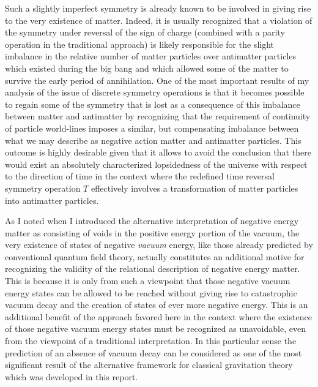 \documentclass[notitlepage,12pt]{report}
\begin{document}
Such a slightly imperfect symmetry is already known to be involved in giving rise to the very existence of matter. Indeed, it is usually recognized that a violation of the symmetry under reversal of the sign of charge (combined with a parity operation in the traditional approach) is likely responsible for the slight imbalance in the relative number of matter particles over antimatter particles which existed during the big bang and which allowed some of the matter to survive the early period of annihilation. One of the most important results of my analysis of the issue of discrete symmetry operations is that it becomes possible to regain some of the symmetry that is lost as a consequence of this imbalance between matter and antimatter by recognizing that the requirement of continuity of particle world-lines imposes a similar, but compensating imbalance between what we may describe as negative action matter and antimatter particles. This outcome is highly desirable given that it allows to avoid the conclusion that there would exist an absolutely characterized lopsidedness of the universe with respect to the direction of time in the context where the redefined time reversal symmetry operation $T$ effectively involves a transformation of matter particles into antimatter particles. 

As I noted when I introduced the alternative interpretation of negative energy matter as consisting of voids in the positive energy portion of the vacuum, the very existence of states of negative \textit{vacuum} energy, like those already predicted by conventional quantum field theory, actually constitutes an additional motive for recognizing the validity of the relational description of negative energy matter. This is because it is only from such a viewpoint that those negative vacuum energy states can be allowed to be reached without giving rise to catastrophic vacuum decay and the creation of states of ever more negative energy. This is an additional benefit of the approach favored here in the context where the existence of those negative vacuum energy states must be recognized as unavoidable, even from the viewpoint of a traditional interpretation. In this particular sense the prediction of an absence of vacuum decay can be considered as one of the most significant result of the alternative framework for classical gravitation theory which was developed in this report.
\end{document}
